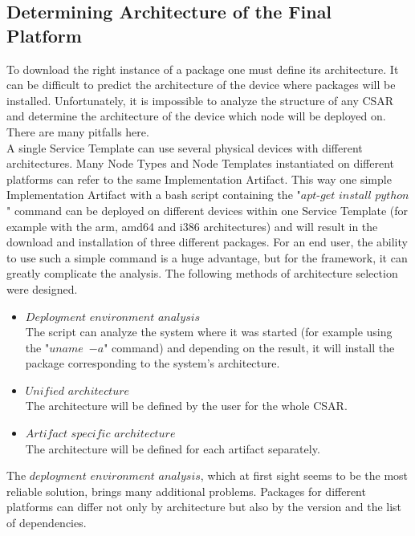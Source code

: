 \subsection{Determining Architecture of the Final Platform} \label{finplatf}
To download the right instance of a package one must define its architecture.
It can be difficult to predict the architecture of the device where packages will be installed.
Unfortunately, it is impossible to analyze the structure of any CSAR and determine the architecture of the device which node will be deployed on.
There are many pitfalls here.\\
A single Service Template can use several physical devices with different architectures.
Many Node Types and Node Templates instantiated on different platforms can refer to the same Implementation Artifact.
This way one simple Implementation Artifact with a bash script containing the "$apt$-$get$ $install$ $python$" command can be deployed on different devices within one Service Template (for example with the arm, amd64 and i386 architectures) and will result in the download and installation of three different packages. 
For an end user, the ability to use such a simple command is a huge advantage, but for the framework, it can greatly complicate the analysis.
The following methods of architecture selection were designed.
\begin{itemize}
	\item $Deployment$ $environment$ $analysis$\\
	The script can analyze the system where it was started (for example using the "$uname$~$-a$" command) and depending on the result, it will install the package corresponding to the system's architecture.
	\item $Unified$ $architecture$\\
	The architecture will be defined by the user for the whole CSAR.
	\item $Artifact$ $specific$ $architecture$\\
	The architecture will be defined for each artifact separately.
\end{itemize}
The $deployment$ $environment$ $analysis$, which at first sight seems to be the most reliable solution, brings many additional problems.
Packages for different platforms can differ not only by architecture but also by the version and the list of dependencies.
